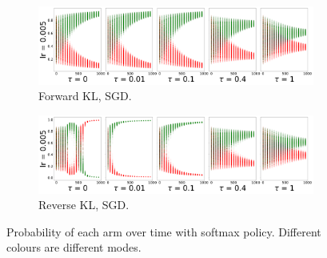 \documentclass{article}
\begin{document}
\begin{figure}[!ht]
  \begin{subfigure}[b]{0.4\linewidth}
    \centering
    \includegraphics[width=1\columnwidth]{figs/discrete-bandit/notlearnQ/sgd/prob_forward_optim=sgd.png}
    \caption{Forward KL, SGD.}
    \label{fig:discrete-bandit-prob-forward-sgd}
  \end{subfigure}%
  \begin{subfigure}[b]{0.4\linewidth}
    \centering
    \includegraphics[width=1\columnwidth]{figs/discrete-bandit/notlearnQ/sgd/prob_reverse_optim=sgd.png}
    \caption{Reverse KL, SGD.}
    \label{fig:discrete-bandit-prob-reverse-sgd}
  \end{subfigure}
  \caption{Probability of each arm over time with softmax policy. Different colours are different modes. }
\end{figure}

  
  
\end{document}
